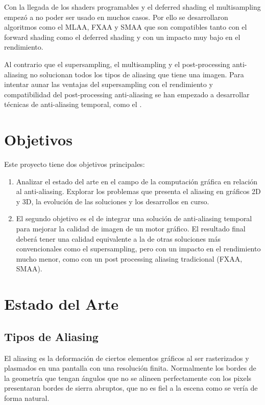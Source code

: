 \documentclass[withindex, glossary]{cam-thesis}
\begin{document}
Con la llegada de los shaders programables y el deferred shading el multisampling empezó a no poder ser usado en muchos casos. Por ello se desarrollaron algoritmos como el MLAA, FXAA y SMAA que son compatibles tanto con el forward shading como el deferred shading y con un impacto muy bajo en el rendimiento.

Al contrario que el supersampling, el multisampling y el post-processing anti-aliasing no solucionan todos los tipos de aliasing que tiene una imagen. Para intentar aunar las ventajas del supersampling con el rendimiento y compatibilidad del post-processing anti-aliasing se han empezado a desarrollar técnicas de anti-aliasing temporal, como el \@.

\chapter{Objetivos}

Este proyecto tiene dos objetivos principales:

\begin{enumerate}
    \item Analizar el estado del arte en el campo de la computación gráfica en relación al anti-aliasing. Explorar los problemas que presenta el aliasing en gráficos 2D y 3D, la evolución de las soluciones y los desarrollos en curso.
    \item El segundo objetivo es el de integrar una solución de anti-aliasing temporal para mejorar la calidad de imagen de un motor gráfico. El resultado final deberá tener una calidad equivalente a la de otras soluciones más convencionales como el supersampling, pero con un impacto en el rendimiento mucho menor, como con un post processing aliasing tradicional (FXAA, SMAA).
\end{enumerate}

\chapter{Estado del Arte}

\section{Tipos de Aliasing}

El aliasing es la deformación de ciertos elementos gráficos al ser rasterizados y plasmados en una pantalla con una resolución finita\cite{Mitchell:1988:RFC:378456.378514}. Normalmente los bordes de la geometría que tengan ángulos que no se alineen perfectamente con los pixels presentaran bordes de sierra abruptos, que no es fiel a la escena como se vería de forma natural.
\end{document}

